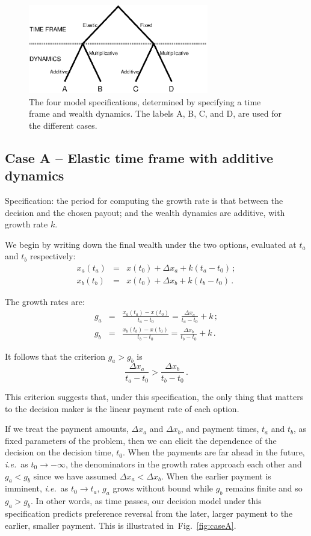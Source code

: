 \documentclass[11pt]{article}
\newcommand{\ie}{{\it i.e.}\ }
\newcommand{\flabel}[1]{\label{fig:#1}}
\newcommand{\fref}[1]{Fig.~\ref{fig:#1}}
\newcommand{\be}{\begin{equation}}
\newcommand{\ee}{\end{equation}}
\newcommand{\bea}{\begin{eqnarray}}
\newcommand{\eea}{\end{eqnarray}}
\newcommand{\Dx}{\Delta x}
\numberwithin{equation}{section}
\begin{document}
\begin{figure}[!htb]
\centering
\includegraphics[width=0.7\textwidth]{./figures/tree.eps}
\caption{The four model specifications, determined by specifying a time frame and wealth dynamics. The labels A, B, C, and D, are used for the different cases.}
\flabel{tree}
\end{figure}

\subsection{Case A -- Elastic time frame with additive dynamics}\label{sec:case_A}

Specification: the period for computing the growth rate is that between the decision and the chosen payout; and the wealth dynamics are additive, with growth rate $k$.

We begin by writing down the final wealth under the two options, evaluated at $t_a$ and $t_b$ respectively:
\bea
x_a\left(t_a\right) &=& x\left(t_0\right) + \Dx_a + k(t_a-t_0)\,;\\
x_b\left(t_b\right) &=& x\left(t_0\right) + \Dx_b + k(t_b-t_0)\,.
\eea

The growth rates are:
\bea
g_a &=& \frac{x_a\left(t_a\right) - x\left(t_0\right)}{t_a-t_0} = \frac{\Dx_a}{t_a-t_0} + k\,;\\
g_b &=& \frac{x_b\left(t_b\right) - x\left(t_0\right)}{t_b-t_0} = \frac{\Dx_b}{t_b-t_0} + k\,.
\eea

It follows that the criterion $g_a > g_b$ is
\be
\frac{\Dx_a}{t_a-t_0} > \frac{\Dx_b}{t_b-t_0}\,.
\ee

This criterion suggests that, under this specification, the only thing that matters to the decision maker is the linear payment rate of each option.

If we treat the payment amounts, $\Dx_a$ and $\Dx_b$, and payment times, $t_a$ and $t_b$, as fixed parameters of the problem, then we can elicit the dependence of the decision on the decision time, $t_0$. When the payments are far ahead in the future, \ie as $t_0\to-\infty$, the denominators in the growth rates approach each other and $g_a<g_b$ since we have assumed $\Dx_a<\Dx_b$. When the earlier payment is imminent, \ie as $t_0\to t_a$, $g_a$ grows without bound while $g_b$ remains finite and so $g_a>g_b$. In other words, as time passes, our decision model under this specification predicts preference reversal from the later, larger payment to the earlier, smaller payment. This is illustrated in~\fref{caseA}.
\end{document}
